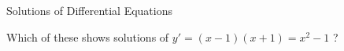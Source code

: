 \newpage


%
%



\begin{module}{Solutions of Differential Equations}
	\label{intro-sols}

	
	
\end{module}



\begin{lesson}

%	
%
%	
%
\end{lesson}




\newpage

\question

Which of these shows solutions of $y' = (x-1)(x+1) = x^2 - 1$ ?

